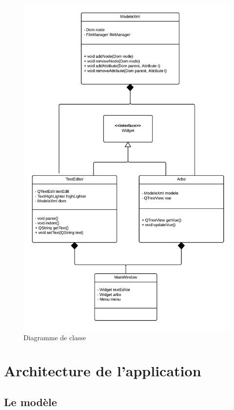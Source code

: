 \begin{figure}[h!]
\begin{minipage}[b]{\linewidth}
\centering \includegraphics[scale=0.4]{images/classes.png}
\caption{Diagramme de classe}
\label{diag_classe}
\end{minipage}
\end{figure}

\section{Architecture de l'application}
\subsection{Le modèle}

